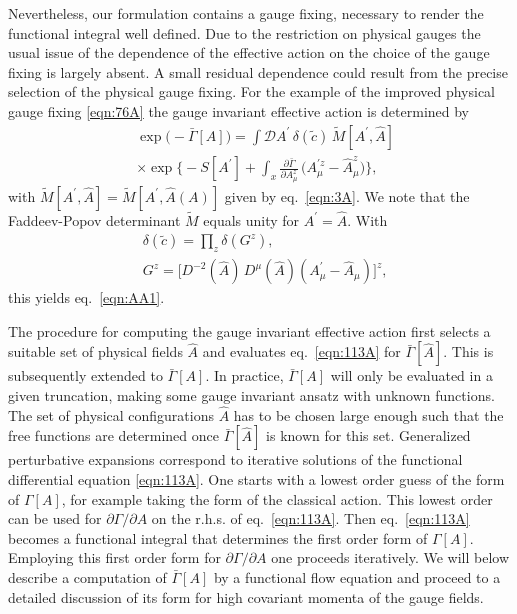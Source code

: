 \documentclass[twocolumn,aps,prd,amsmath,amssymb,preprintnumbers,longbibliography]{revtex4-1}
\numberwithin{equation}{section}
\newenvironment{alignedeqn}{\begin{equation}\begin{aligned}}{\end{aligned}\end{equation}\ignorespacesafterend}
\begin{document}
Nevertheless, our formulation contains a gauge fixing, necessary to render the functional integral well defined. Due to the restriction on physical gauges the usual issue of the dependence of the effective action on the choice of the gauge fixing is largely absent. A small residual dependence could result from the precise selection of the physical gauge fixing. For the example of the improved physical gauge fixing \eqref{eqn:76A} the gauge invariant effective action is determined by
\begin{alignedeqn}\label{eqn:101A}
	&\exp\bigl(-\bar\Gamma[A]\bigr)
	= \int \mathcal{D} A^\prime \, \delta(\tilde{c}) \, \tilde{M}[A^\prime,\hat{A}]\\
	&\times \exp\biggl\{-S[A^\prime] + \int_x \frac{\partial \bar\Gamma}{\partial A_\mu^z} \, \bigl(A_\mu^{\prime z} - \hat{A}_\mu^z\bigr)\biggr\},
\end{alignedeqn}
with $\tilde{M}[A^\prime,\hat{A}] = \tilde{M}[A^\prime,\hat{A}(A)]$ given by eq.~\eqref{eqn:3A}. We note that the Faddeev-Popov determinant $\tilde{M}$ equals unity for $A^\prime = \hat{A}$. With
\begin{alignedeqn}\label{eqn:101B}
	&\delta(\tilde{c})
	= \prod_z \delta(G^z),\\
	&G^z
	= \bigl[D^{-2}(\hat{A}) \, D^\mu(\hat{A}) (A_\mu^\prime - \hat{A}_\mu)\bigr]^z,
\end{alignedeqn}
this yields eq.~\eqref{eqn:AA1}.

The procedure for computing the gauge invariant effective action first selects a suitable set of physical fields $\hat{A}$ and evaluates eq.~\eqref{eqn:113A} for $\bar{\Gamma}[\hat{A}]$. This is subsequently extended to $\bar{\Gamma}[A]$. In practice, $\bar{\Gamma}[A]$ will only be evaluated in a given truncation, making some gauge invariant ansatz with unknown functions. The set of physical configurations $\hat{A}$ has to be chosen large enough such that the free functions are determined once $\bar{\Gamma}[\hat{A}]$ is known for this set. Generalized perturbative expansions correspond to iterative solutions of the functional differential equation \eqref{eqn:113A}. One starts with a lowest order guess of the form of $\Gamma[A]$, for example taking the form of the classical action. This lowest order can be used for $\partial\Gamma /\partial A$ on the r.h.s. of eq.~\eqref{eqn:113A}. Then eq.~\eqref{eqn:113A} becomes a functional integral that determines the first order form of $\Gamma[A]$. Employing this first order form for $\partial\Gamma /\partial A$ one proceeds iteratively. We will below describe a computation of $\bar{\Gamma}[A]$ by a functional flow equation and proceed to a detailed discussion of its form for high covariant momenta of the gauge fields.
\end{document}
